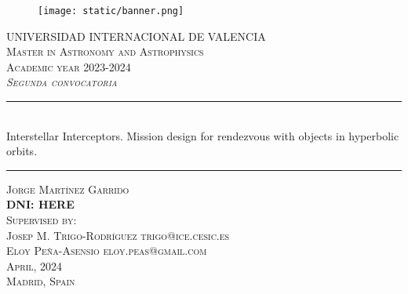 \begin{titlepage}

  \begin{center}

    \begin{figure}[h]
      \centering
      \texttt{[image: static/banner.png]}
    \end{figure}
    \vspace{1cm}

    \textsc{\large
      UNIVERSIDAD INTERNACIONAL DE VALENCIA
    }\\[0.25cm]
    \textsc{\large
      Master in Astronomy and Astrophysics \\
      Academic year 2023-2024
    }\\[1cm]
    \textsc{\large
    \textit{Segunda convocatoria}
    }\\[1.25cm]

    \noindent\rule{\textwidth}{1pt}
    \\[0.25cm]
    {
    \fontsize{35pt}{35pt}\selectfont
    {
      Interstellar Interceptors. Mission design for rendezvous with objects in hyperbolic orbits.
    }
    }
    \noindent\rule{\textwidth}{1pt}

    \vspace{1.5cm}
    \textsc{\Large
      Jorge Martínez Garrido \\
      \textbf{DNI: HERE}
    }\\[1.25cm]
    \textsc{\large
      Supervised by:
    }\\[0.25cm]
    \textsc{\large
     Josep M. Trigo-Rodríguez trigo@ice.cesic.es \\
     Eloy Peña-Asensio eloy.peas@gmail.com
    }\\[1.5cm]

    \textsc{\large
       April, 2024
    }\\[0.25cm]
    \textsc{\large
       Madrid, Spain
    }\\[0.25cm]

  \end{center}
\end{titlepage}
